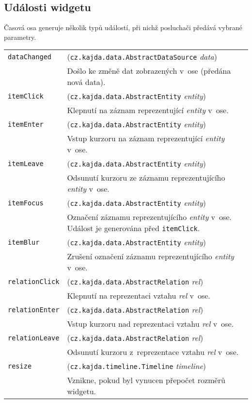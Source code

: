 {	\subsection*{Události widgetu}
	Časová osa generuje několik typů událostí, při nichž posluchači předává vybrané parametry. 
	\begin{longtable}{|p{}p{}|}
		\hline
		{\tt dataChanged} & ({\tt cz.kajda.data.AbstractDataSource} \emph{data})\\
		& Došlo ke změně dat zobrazených v~ose (předána nová data). \\
		\hline
		{\tt itemClick} & ({\tt cz.kajda.data.AbstractEntity} \emph{entity})\\
		& Klepnutí na záznam reprezentující \emph{entity} v~ose. \\
		\hline
		{\tt itemEnter} & ({\tt cz.kajda.data.AbstractEntity} \emph{entity})\\
		& Vstup kurzoru na záznam reprezentující \emph{entity} v~ose. \\
		\hline
		{\tt itemLeave} & ({\tt cz.kajda.data.AbstractEntity} \emph{entity})\\
		& Odsunutí kurzoru ze záznamu reprezentujícího \emph{entity} v~ose. \\
		\hline
		{\tt itemFocus} & ({\tt cz.kajda.data.AbstractEntity} \emph{entity})\\
		& Označení záznamu reprezentujícího \emph{entity} v~ose. Událost je generována před {\tt itemClick}.\\
		\hline
		{\tt itemBlur} & ({\tt cz.kajda.data.AbstractEntity} \emph{entity})\\
		& Zrušení označení záznamu reprezentujícího \emph{entity} v~ose. \\
		\hline
		{\tt relationClick} & ({\tt cz.kajda.data.AbstractRelation} \emph{rel})\\
		& Klepnutí na reprezentaci vztahu \emph{rel} v~ose. \\
		\hline
		{\tt relationEnter} & ({\tt cz.kajda.data.AbstractRelation} \emph{rel})\\
		& Vstup kurzoru nad reprezentaci vztahu \emph{rel} v~ose. \\
		\hline
		{\tt relationLeave} & ({\tt cz.kajda.data.AbstractRelation} \emph{rel})\\
		& Odsunutí kurzoru z~reprezentace vztahu \emph{rel} v~ose. \\
		\hline
		{\tt resize} & ({\tt cz.kajda.timeline.Timeline} \emph{timeline})\\
		& Vznikne, pokud byl vynucen přepočet rozměrů widgetu. \\

\end{longtable}}
